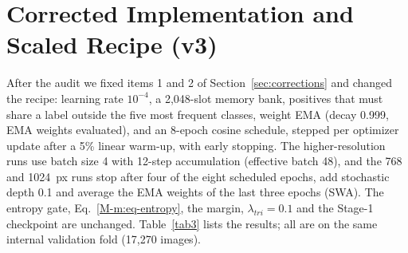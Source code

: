 \documentclass[conference]{IEEEtran}
\begin{document}
\section{Corrected Implementation and Scaled Recipe (v3)}
\label{s:v3}\label{sec:v3}
After the audit we fixed items 1 and 2 of Section~\ref{sec:corrections} and changed the recipe: learning rate $10^{-4}$, a 2,048-slot memory bank, positives that must share a label outside the five most frequent classes, weight EMA (decay 0.999, EMA weights evaluated), and an 8-epoch cosine schedule, stepped per optimizer update after a 5\% linear warm-up, with early stopping. The higher-resolution runs use batch size 4 with 12-step accumulation (effective batch 48), and the 768 and 1024~px runs stop after four of the eight scheduled epochs, add stochastic depth 0.1 and average the EMA weights of the last three epochs (SWA). The entropy gate, Eq.~\ref{M-m:eq-entropy}, the margin, $\lambda_{tri}{=}0.1$ and the Stage-1 checkpoint are unchanged. Table~\ref{tab3} lists the results; all are on the same internal validation fold (17,270 images).

\begin{table}[htbp]
\caption{Corrected implementation (v3), internal validation. Single models report the best epoch of the EMA weights or their SWA, without test-time augmentation unless stated. ``Flip'' averages the prediction with that of the horizontally flipped image. The greedy ensemble is a uniform average of three models chosen by forward selection on this validation fold, so it is optimistic; the fixed four-model average has no selection. -- = not computed.}
\begin{center}
\label{tab3}
\end{center}
\end{table}
\end{document}

